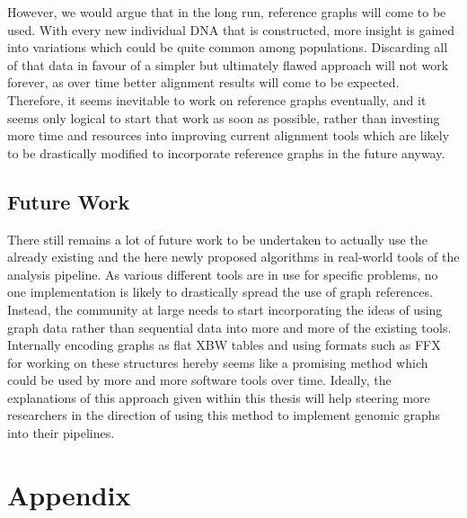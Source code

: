 \documentclass[a4paper,12pt,twoside,BCOR=10mm]{scrbook}
\begin{document}
However, we would argue that in the long run, reference graphs will come to be used. 
With every new individual DNA that is constructed, more insight is gained into 
variations which could be quite common among populations. 
Discarding all of that data in favour of a simpler but ultimately flawed approach 
will not work forever, as over time better alignment results will come to be expected. \\
Therefore, it seems inevitable to work on reference graphs eventually, 
and it seems only logical to start that work as soon as possible, rather than investing 
more time and resources into improving current alignment tools which are likely to be drastically 
modified to incorporate reference graphs in the future anyway.

\section{Future Work}

There still remains a lot of future work to be undertaken to actually use 
the already existing and the here newly proposed algorithms in real-world 
tools of the analysis pipeline. 
% 
% 
As various different tools are in use for specific problems, no one implementation 
is likely to drastically spread the use of graph references. 
Instead, the community at large needs to start 
incorporating the ideas of using graph data rather than sequential data into 
more and more of the existing tools. \\
Internally encoding graphs as flat XBW tables and using formats such as FFX for working on 
these structures hereby seems like a promising method which could be used by more and 
more software tools over time. Ideally, the explanations of this approach given within this 
thesis will help steering more researchers in the direction of using this method to implement 
genomic graphs into their pipelines.



\appendix
\renewcommand{\chaptername}{Appendix}
\chapter{Appendix}
%
\end{document}
